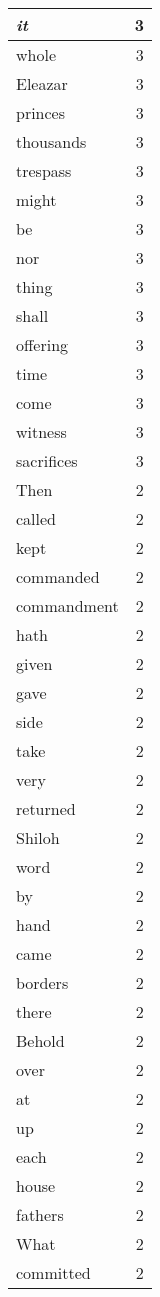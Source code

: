 \begin{center}
\begin{longtable}{l|r}
\emph{it} & 3\\ \hline 
whole & 3\\ \hline 
Eleazar & 3\\ \hline 
princes & 3\\ \hline 
thousands & 3\\ \hline 
trespass & 3\\ \hline 
might & 3\\ \hline 
be & 3\\ \hline 
nor & 3\\ \hline 
thing & 3\\ \hline 
shall & 3\\ \hline 
offering & 3\\ \hline 
time & 3\\ \hline 
come & 3\\ \hline 
witness & 3\\ \hline 
sacrifices & 3\\ \hline 
Then & 2\\ \hline 
called & 2\\ \hline 
kept & 2\\ \hline 
commanded & 2\\ \hline 
commandment & 2\\ \hline 
hath & 2\\ \hline 
given & 2\\ \hline 
gave & 2\\ \hline 
side & 2\\ \hline 
take & 2\\ \hline 
very & 2\\ \hline 
returned & 2\\ \hline 
Shiloh & 2\\ \hline 
word & 2\\ \hline 
by & 2\\ \hline 
hand & 2\\ \hline 
came & 2\\ \hline 
borders & 2\\ \hline 
there & 2\\ \hline 
Behold & 2\\ \hline 
over & 2\\ \hline 
at & 2\\ \hline 
up & 2\\ \hline 
each & 2\\ \hline 
house & 2\\ \hline 
fathers & 2\\ \hline 
What & 2\\ \hline 
committed & 2\\ \hline 

\end{longtable}
\end{center}
